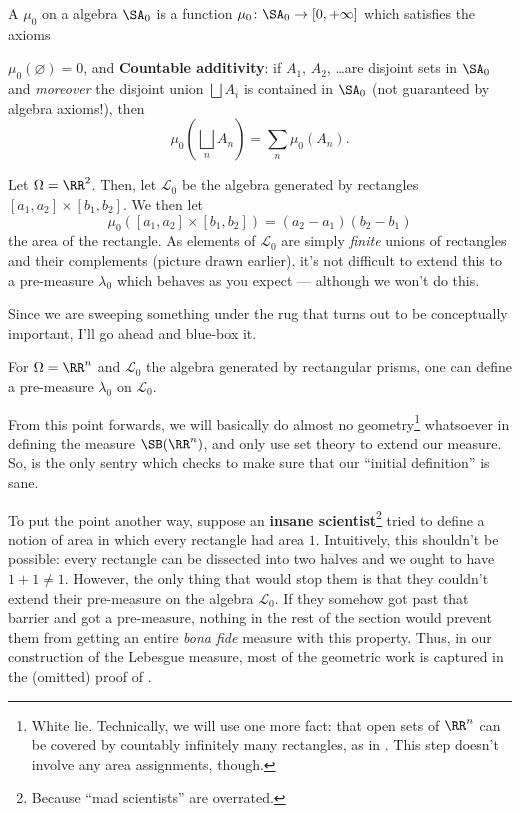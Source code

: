 \begin{definition}
	A  $\mu_0$ on a algebra $\SA_0$
	is a function $\mu_0 \colon \SA_0 \to [0, +\infty]$
	which satisfies the axioms
	\begin{itemize}
		\ii $\mu_0(\varnothing) = 0$, and
		\ii \textbf{Countable additivity}:
		if $A_1$, $A_2$, \dots are disjoint sets in $\SA_0$
		and \emph{moreover} the disjoint union $\bigsqcup A_i$
		is contained in $\SA_0$ (not guaranteed by algebra axioms!),
		then
		\[ \mu_0\left( \bigsqcup_n A_n \right) = \sum_n \mu_0(A_n). \]
	\end{itemize}
\end{definition}

\begin{example}
	Let $\Omega = \RR^2$.
	Then, let $\mathcal{L}_0$ be the algebra generated by rectangles
	$[a_1, a_2] \times [b_1, b_2]$.
	We then let
	\[ \mu_0\left( [a_1, a_2] \times [b_1, b_2] \right)
	= (a_2-a_1)(b_2-b_1) \]
	the area of the rectangle.
	As elements of $\mathcal{L}_0$ are simply \emph{finite} unions
	of rectangles and their complements (picture drawn earlier),
	it's not difficult to extend this to a pre-measure $\lambda_0$
	which behaves as you expect --- although we won't do this.
\end{example}

Since we are sweeping something under the rug that
turns out to be conceptually important,
I'll go ahead and blue-box it.
\begin{proposition}
	\label{prop:lebesgue_rectangle}
	For $\Omega = \RR^n$ and $\mathcal{L}_0$
	the algebra generated by rectangular prisms,
	one can define a pre-measure $\lambda_0$ on $\mathcal{L}_0$.
\end{proposition}
From this point forwards, we will basically do
almost no geometry\footnote{White lie.
	Technically, we will use one more fact:
	that open sets of $\RR^n$ can be covered by countably
	infinitely many rectangles,
	as in .
	This step doesn't involve any area assignments, though.}
whatsoever in defining the measure $\SB(\RR^n)$,
and only use set theory to extend our measure.
So,  is the only sentry
which checks to make sure that our ``initial definition'' is sane.

To put the point another way,
suppose an \textbf{insane scientist}\footnote{Because
	``mad scientists'' are overrated.}
tried to define a notion
of area in which every rectangle had area $1$.
Intuitively, this shouldn't be possible:
every rectangle can be dissected into two halves
and we ought to have $1+1 \ne 1$.
However, the only thing that would stop them is that they couldn't
extend their pre-measure on the algebra $\mathcal{L}_0$.
If they somehow got past that barrier and got a pre-measure,
nothing in the rest of the section would prevent them
from getting an entire \emph{bona fide} measure with this property.
Thus, in our construction of the Lebesgue measure,
most of the geometric work is captured in the (omitted) proof
of .

